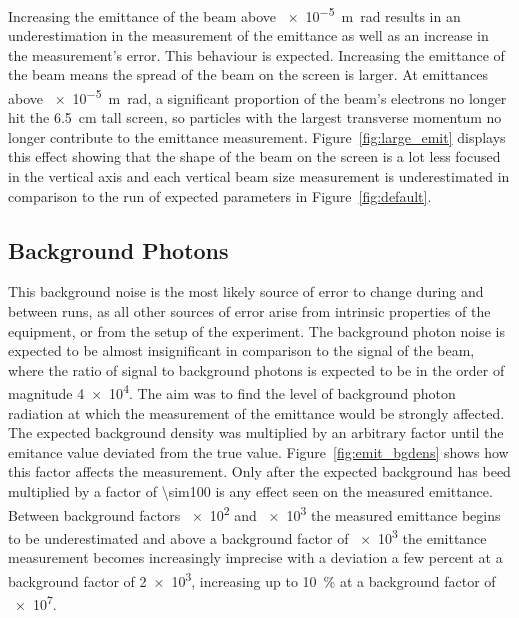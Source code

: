 Increasing the emittance of the beam above \SI{e-5}{\meter\radian} results in an
underestimation in the measurement of the emittance as well as an increase in
the measurement's error. This behaviour is expected. Increasing the emittance of
the beam means the spread of the beam on the screen is larger. At emittances
above \SI{e-5}{\meter\radian}, a significant proportion of the beam's electrons
no longer hit the \SI{6.5}{\centi\meter} tall screen, so particles with the
largest transverse momentum no longer contribute to the emittance measurement.
Figure~\ref{fig:large_emit} displays this effect showing that the shape of the
beam on the screen is a lot less focused in the vertical axis and each vertical
beam size measurement is underestimated in comparison to the run of expected
parameters in Figure~\ref{fig:default}.



\subsection{Background Photons}

This background noise is the most likely source of error to change during and
between runs, as all other sources of error arise from intrinsic properties of
the equipment, or from the setup of the experiment. The background photon noise
is expected to be almost insignificant in comparison to the signal of the beam,
where the ratio of signal to background photons is expected to be in the order
of magnitude \num{4e4}. The aim was to find the level of background photon
radiation at which the measurement of the emittance would be strongly affected.
The expected background density was multiplied by an arbitrary factor until the
emitance value deviated from the true value.  Figure~\ref{fig:emit_bgdens} shows
how this factor affects the measurement. Only after the expected background has
beed multiplied by a factor of \num{\sim100} is any effect seen on the measured
emittance. Between background factors \num{e2} and \num{e3} the measured
emittance begins to be underestimated and above a background factor of \num{e3}
the emittance measurement becomes increasingly imprecise with a deviation a few
percent at a background factor of \num{2e3}, increasing up to \SI{10}{\percent}
at a background factor of \num{e7}.

